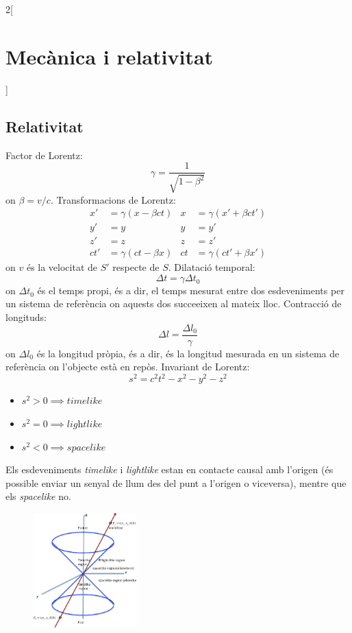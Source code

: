 \documentclass[class=article,10pt,crop=false]{standalone}
\begin{document}
\begin{multicols}{2}[\section{Mecànica i relativitat}]
\subsection{Relativitat}
Factor de Lorentz:
$$\gamma=\frac{1}{\sqrt{1-\beta^2}}$$ {on $\beta=v/c$.}\newline
Transformacions de Lorentz:
\begin{align*}
    x'&=\gamma(x-\beta ct) & x&=\gamma(x'+\beta ct')\\
    y'&=y & y&=y'\\
    z'&=z & z&=z'\\
    ct'&=\gamma(ct-\beta x) & ct&=\gamma(ct'+\beta x')
\end{align*}
{on $v$ és la velocitat de $S'$ respecte de $S$.}\newline
Dilatació temporal:
$$\Delta t=\gamma \Delta t_0^{}$$ {on $\Delta t_0^{}$ és el temps propi, és a dir, el temps mesurat entre dos esdeveniments per un sistema de referència on aquests dos succeeixen al mateix lloc.}\newline
Contracció de longituds:
$$\Delta l=\frac{\Delta l_0^{}}{\gamma}$$ {on $\Delta l_0^{}$ és la longitud pròpia, és a dir, és la longitud mesurada en un sistema de referència on l'objecte està en repòs.}\newline
Invariant de Lorentz:
$$s^2=c^2t^2-x^2-y^2-z^2$$
\begin{itemize}
    \item $s^2>0\implies\textit{timelike}$
    \item $s^2=0\implies\textit{lightlike}$
    \item $s^2<0\implies\textit{spacelike}$
\end{itemize}
Els esdeveniments \textit{timelike} i \textit{lightlike} estan en contacte causal amb l'origen (és possible enviar un senyal de llum des del punt a l'origen o viceversa), mentre que els \textit{spacelike} no.\newline
\begin{figure}[ht]
    \centering
    \includegraphics[width=4cm]{Physics/1st/Mecanica_i_relativitat/Imatges/mink.png}

\end{figure}
\end{multicols}
\end{document}
